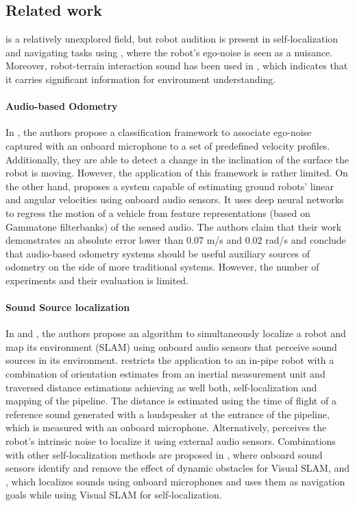 \subsection{Related work} \label{sec:related-work}

 is a relatively unexplored field, but robot
audition is present in self-localization and navigating tasks using
, where the robot's ego-noise is seen
as a nuisance. Moreover, robot-terrain interaction sound has been used in
, which indicates that it carries
significant information for environment understanding.

\paragraph{Audio-based Odometry} \label{para:audio-based-odometry} In
\cite{HowDoISoundLike}, the authors propose a classification framework to
associate ego-noise captured with an onboard microphone to a set of predefined
velocity profiles. Additionally, they are able to detect a change in the
inclination of the surface the robot is moving. However, the application of
this framework is rather limited. On the other hand, \cite{marchegiani2018a}
proposes a system capable of estimating ground robots' linear and angular
velocities using onboard audio sensors. It uses deep neural networks to
regress the motion of a vehicle from feature representations (based on
Gammatone filterbanks) of the sensed audio. The authors claim that their work
demonstrates an absolute error lower than 0.07 m/s and 0.02 rad/s and
conclude that audio-based odometry systems should be useful auxiliary sources
of odometry on the side of more traditional systems. However, the number of
experiments and their evaluation is limited.

\paragraph{Sound Source localization} \label{para:sound-source-localization} In
\cite{AcousticSLAM} and \cite{SoundSourceMapping}, the authors propose an
algorithm to simultaneously localize a robot and map its environment (SLAM)
using onboard audio sensors that perceive sound sources in its environment.
\cite{SnakeSound} restricts the application to an in-pipe robot with a
combination of orientation estimates from an inertial measurement unit and
traversed distance estimations achieving as well both, self-localization and
mapping of the pipeline. The distance is estimated using the time of flight of
a reference sound generated with a loudspeaker at the entrance of the pipeline,
which is measured with an onboard microphone. Alternatively, \cite{Allen2012}
perceives the robot's intrinsic noise to localize it using external audio
sensors. Combinations with other self-localization methods are proposed in
\cite{AcousticFusion}, where onboard sound sensors identify and remove the
effect of dynamic obstacles for Visual SLAM, and \cite{Gautam2014}, which
localizes sounds using onboard microphones and uses them as navigation goals
while using Visual SLAM for self-localization.

